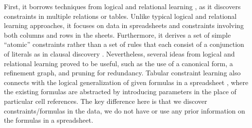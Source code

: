 First, it borrows techniques from logical and relational learning \parencite{luc_book}, as it discovers
constraints in multiple relations or tables. Unlike typical logical and relational learning
approaches, it focuses on data in spreadsheets and constraints involving both columns and rows in the sheets.
Furthermore, it derives a set of simple ``atomic'' constraints rather than a set of rules that each consist of a conjunction of literals as in clausal discovery \parencite{claudien,lallouet}. Nevertheless, several ideas from logical and relational learning
proved to be useful, such as the use of a canonical form, a refinement graph, and pruning for redundancy. Tabular constraint learning also connects with the logical generalization of given formulas in a spreadsheet \parencite{Isakowitz}, where the existing formulas are abstracted by introducing parameters in the place of particular cell references. The key difference here is that we discover constraints/formulas in the data, we do not have or use any prior information on the formulas in a spreadsheet.


